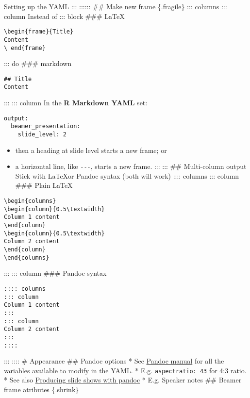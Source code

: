 \documentclass[
  10pt,
  ignorenonframetext,
  aspectratio=169,
]{beamer}
\providecommand{\tightlist}{%
  \setlength{\itemsep}{0pt}\setlength{\parskip}{0pt}}
\begin{document}
\begin{frame}[fragile]{Setting up the YAML}
::: :::::: \#\# Make new frame \{.fragile\} ::: columns ::: column
Instead of ::: block \#\#\# \LaTeX

\begin{verbatim}
\begin{frame}{Title}
Content
\ end{frame}
\end{verbatim}

::: do \#\#\# markdown

\begin{verbatim}
## Title
Content
\end{verbatim}

::: ::: column In the \textbf{R Markdown YAML} set:

\begin{verbatim}
output:
  beamer_presentation:
    slide_level: 2
\end{verbatim}

\begin{itemize}
\tightlist
\item
  then a heading at slide level starts a new frame; or
\item
  a horizontal line, like \texttt{-\/-\/-}, starts a new frame. ::: :::
  \#\# Multi-column output Stick with \LaTeX or Pandoc syntax (both will
  work) :::: columns ::: column \#\#\# Plain \LaTeX
\end{itemize}

\begin{verbatim}
\begin{columns}
\begin{column}{0.5\textwidth}
Column 1 content
\end{column}
\begin{column}{0.5\textwidth}
Column 2 content
\end{column}
\end{columns}
\end{verbatim}

::: ::: column \#\#\# Pandoc syntax

\begin{verbatim}
:::: columns
::: column
Column 1 content
:::
::: column
Column 2 content
:::
::::
\end{verbatim}

::: :::: \# Appearance \#\# Pandoc options * See
\href{https://pandoc.org/MANUAL.html\#variables-for-beamer-slides}{Pandoc
manual} for all the variables available to modify in the YAML. * E.g.
\texttt{aspectratio:\ 43} for 4:3 ratio. * See also
\href{https://pandoc.org/MANUAL.html\#producing-slide-shows-with-pandoc}{Producing
slide shows with pandoc} * E.g. Speaker notes \#\# Beamer frame
atributes \{.shrink\}


\end{frame}
\end{document}
